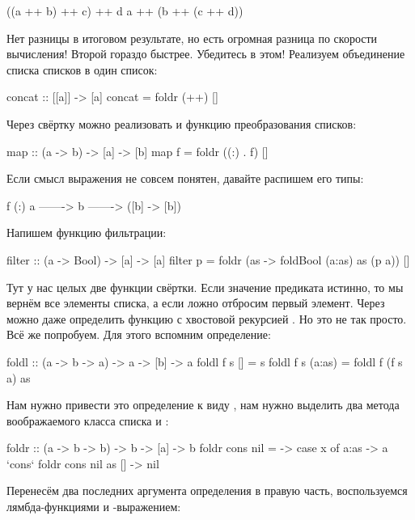 \begin{code}
((a ++ b) ++ c) ++ d
a ++ (b ++ (c ++ d))
\end{code}

Нет разницы в итоговом результате, но есть огромная разница по скорости
вычисления! Второй гораздо быстрее. Убедитесь в этом! Реализуем
объединение списка списков в один список:


\begin{code}
concat :: [[a]] -> [a]
concat = foldr (++) []
\end{code}

Через свёртку можно реализовать и функцию преобразования списков:


\begin{code}
map :: (a -> b) -> [a] -> [b]
map f = foldr ((:) . f) []
\end{code}

Если смысл выражения  не совсем понятен, давайте распишем
его типы:


\begin{code}
      f           (:)
a  ------->  b  ------->  ([b] -> [b])
\end{code}

Напишем функцию фильтрации:


\begin{code}
filter :: (a -> Bool) -> [a] -> [a]
filter p = foldr (\a as -> foldBool (a:as) as (p a)) []
\end{code}

Тут у нас целых две функции свёртки. Если значение предиката 
истинно, то мы вернём все элементы списка, а если ложно отбросим первый
элемент. Через  можно даже определить функцию с хвостовой
рекурсией . Но это не так просто. Всё же попробуем. Для этого
вспомним определение:


\begin{code}
foldl :: (a -> b -> a) -> a -> [b] -> a
foldl f s []        = s
foldl f s (a:as)    = foldl f (f s a) as
\end{code}

Нам нужно привести это определение к виду , нам нужно выделить
два метода воображаемого класса списка  и :


\begin{code}
foldr :: (a -> b -> b) -> b -> [a] -> b
foldr cons nil = \x -> case x of
    a:as    -> a `cons` foldr cons nil as
    []      -> nil    
\end{code}

Перенесём два последних аргумента определения  в правую часть,
воспользуемся лямбда-функциями и -выражением:


